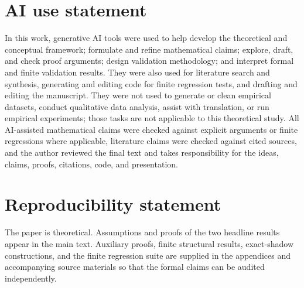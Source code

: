 \documentclass{article}
\begin{document}
\section*{AI use statement}
In this work, generative AI tools were used to help develop the theoretical and conceptual framework; formulate and refine mathematical claims; explore, draft, and check proof arguments; design validation methodology; and interpret formal and finite validation results. They were also used for literature search and synthesis, generating and editing code for finite regression tests, and drafting and editing the manuscript. They were not used to generate or clean empirical datasets, conduct qualitative data analysis, assist with translation, or run empirical experiments; those tasks are not applicable to this theoretical study. All AI-assisted mathematical claims were checked against explicit arguments or finite regressions where applicable, literature claims were checked against cited sources, and the author reviewed the final text and takes responsibility for the ideas, claims, proofs, citations, code, and presentation.

\section*{Reproducibility statement}
The paper is theoretical. Assumptions and proofs of the two headline results appear in the main text. Auxiliary proofs, finite structural results, exact-shadow constructions, and the finite regression suite are supplied in the appendices and accompanying source materials so that the formal claims can be audited independently.




\appendix





\end{document}
